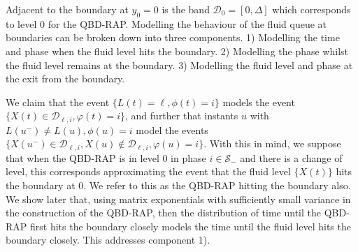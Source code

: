 Adjacent to the boundary at \(y_0=0\) is the band \(\mathcal D_0=[0,\Delta]\) which corresponds to level \(0\) for the QBD-RAP. Modelling the behaviour of the fluid queue at boundaries can be broken down into three components. 1) Modelling the time and phase when the fluid level hits the boundary. 2) Modelling the phase whilst the fluid level remains at the boundary. 3) Modelling the fluid level and phase at the exit from the boundary. 

We claim that the event \(\{L(t)=\ell,\phi(t)=i\}\) models the event \(\{X(t)\in\mathcal D_{\ell,i},\varphi(t)=i\}\), and further that instants \(u\) with \(L(u^-)\neq L(u), \phi(u)=i\) model the events \(\{X(u^-)\in \mathcal D_{\ell,i}, X(u)\notin\mathcal D_{\ell,i},\varphi(u)=i\}\). With this in mind, we suppose that when the QBD-RAP is in level \(0\) in phase \(i\in\mathcal S_-\) and there is a change of level, this corresponds approximating the event that the fluid level \(\{X(t)\}\) hits the boundary at \(0\). We refer to this as the QBD-RAP hitting the boundary also. We show later that, using matrix exponentials with sufficiently small variance in the construction of the QBD-RAP, then the distribution of time until the QBD-RAP first hits the boundary closely models the time until the fluid level hits the boundary closely. This addresses component 1). 


